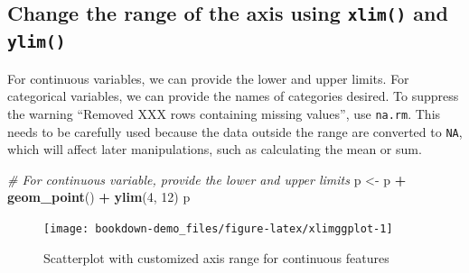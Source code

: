 \documentclass[]{book}
\newenvironment{Shaded}{\begin{snugshade}}{\end{snugshade}}
\newcommand{\KeywordTok}[1]{\textcolor[rgb]{0.13,0.29,0.53}{\textbf{#1}}}
\newcommand{\DataTypeTok}[1]{\textcolor[rgb]{0.13,0.29,0.53}{#1}}
\newcommand{\DecValTok}[1]{\textcolor[rgb]{0.00,0.00,0.81}{#1}}
\newcommand{\StringTok}[1]{\textcolor[rgb]{0.31,0.60,0.02}{#1}}
\newcommand{\CommentTok}[1]{\textcolor[rgb]{0.56,0.35,0.01}{\textit{#1}}}
\newcommand{\OtherTok}[1]{\textcolor[rgb]{0.56,0.35,0.01}{#1}}
\newcommand{\OperatorTok}[1]{\textcolor[rgb]{0.81,0.36,0.00}{\textbf{#1}}}
\newcommand{\NormalTok}[1]{#1}
\begin{document}
\subsection{\texorpdfstring{Change the range of the axis using
\texttt{xlim()} and
\texttt{ylim()}}{Change the range of the axis using xlim() and ylim()}}\label{change-the-range-of-the-axis-using-xlim-and-ylim}

For continuous variables, we can provide the lower and upper limits. For
categorical variables, we can provide the names of categories desired.
To suppress the warning ``Removed XXX rows containing missing values'',
use \texttt{na.rm}. This needs to be carefully used because the data
outside the range are converted to \texttt{NA}, which will affect later
manipulations, such as calculating the mean or sum.

\begin{Shaded}
\begin{Highlighting}[]
\CommentTok{# For continuous variable, provide the lower and upper limits}
\NormalTok{p <-}\StringTok{ }\NormalTok{p }\OperatorTok{+}\StringTok{ }\KeywordTok{geom_point}\NormalTok{() }\OperatorTok{+}\StringTok{ }\KeywordTok{ylim}\NormalTok{(}\DecValTok{4}\NormalTok{, }\DecValTok{12}\NormalTok{) }
\NormalTok{p}
\end{Highlighting}
\end{Shaded}

\begin{figure}

{\centering \texttt{[image: bookdown-demo\_files/figure-latex/xlimggplot-1]} 

}

\caption{Scatterplot with customized axis range for continuous features}\label{fig:xlimggplot}
\end{figure}

\begin{Shaded}
\end{Shaded}
\end{document}
